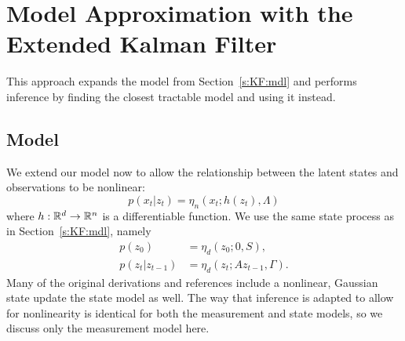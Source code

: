 \section{Model Approximation with the Extended Kalman Filter} \label{s:EKF} 

This approach expands the model from Section~\ref{s:KF:mdl} and performs inference by finding the closest tractable model and using it instead. 

\subsection{Model} \label{s:EKF:mdl}
We extend our model now to allow the relationship between the latent states and observations to be nonlinear:  
\begin{equation} \label{e:s1:EKFobs}
p(x_t|z_t) = \eta_n(x_t;h(z_t),\Lambda)
\end{equation}
where $h:\mathbb{R}^d \to \mathbb{R}^n$ is a differentiable function. We use the same state process as in Section~\ref{s:KF:mdl}, namely
\begin{subequations}
\begin{align}
 p(z_0) & = \eta_d(z_0;0,S), \\ 
 p(z_t|z_{t-1}) & = \eta_d(z_t;Az_{t-1},\Gamma).
\end{align}
\end{subequations}
Many of the original derivations and references include a nonlinear, Gaussian state update the state model as well.  The way that inference is adapted to allow for nonlinearity is identical for both the measurement and state models, so we discuss only the measurement model here.

